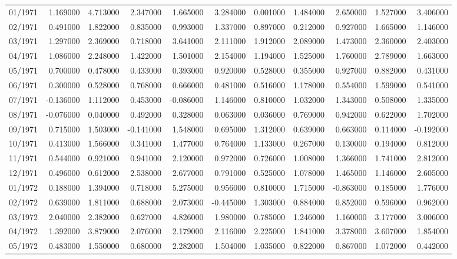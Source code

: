 \begin{tabular}{lrrrrrrrrrr}
01/1971 & 1.169000 & 4.713000 & 2.347000 & 1.665000 & 3.284000 & 0.001000 & 1.484000 & 2.650000 & 1.527000 & 3.406000 \\
02/1971 & 0.491000 & 1.822000 & 0.835000 & 0.993000 & 1.337000 & 0.897000 & 0.212000 & 0.927000 & 1.665000 & 1.146000 \\
03/1971 & 1.297000 & 2.369000 & 0.718000 & 3.641000 & 2.111000 & 1.912000 & 2.089000 & 1.473000 & 2.360000 & 2.403000 \\
04/1971 & 1.086000 & 2.248000 & 1.422000 & 1.501000 & 2.154000 & 1.194000 & 1.525000 & 1.760000 & 2.789000 & 1.663000 \\
05/1971 & 0.700000 & 0.478000 & 0.433000 & 0.393000 & 0.920000 & 0.528000 & 0.355000 & 0.927000 & 0.882000 & 0.431000 \\
06/1971 & 0.300000 & 0.528000 & 0.768000 & 0.666000 & 0.481000 & 0.516000 & 1.178000 & 0.554000 & 1.599000 & 0.541000 \\
07/1971 & -0.136000 & 1.112000 & 0.453000 & -0.086000 & 1.146000 & 0.810000 & 1.032000 & 1.343000 & 0.508000 & 1.335000 \\
08/1971 & -0.076000 & 0.040000 & 0.492000 & 0.328000 & 0.063000 & 0.036000 & 0.769000 & 0.942000 & 0.622000 & 1.702000 \\
09/1971 & 0.715000 & 1.503000 & -0.141000 & 1.548000 & 0.695000 & 1.312000 & 0.639000 & 0.663000 & 0.114000 & -0.192000 \\
10/1971 & 0.413000 & 1.566000 & 0.341000 & 1.477000 & 0.764000 & 1.133000 & 0.267000 & 0.130000 & 0.194000 & 0.812000 \\
11/1971 & 0.544000 & 0.921000 & 0.941000 & 2.120000 & 0.972000 & 0.726000 & 1.008000 & 1.366000 & 1.741000 & 2.812000 \\
12/1971 & 0.496000 & 0.612000 & 2.538000 & 2.677000 & 0.791000 & 0.525000 & 1.078000 & 1.465000 & 1.146000 & 2.605000 \\
01/1972 & 0.188000 & 1.394000 & 0.718000 & 5.275000 & 0.956000 & 0.810000 & 1.715000 & -0.863000 & 0.185000 & 1.776000 \\
02/1972 & 0.639000 & 1.811000 & 0.688000 & 2.073000 & -0.445000 & 1.303000 & 0.884000 & 0.852000 & 0.596000 & 0.962000 \\
03/1972 & 2.040000 & 2.382000 & 0.627000 & 4.826000 & 1.980000 & 0.785000 & 1.246000 & 1.160000 & 3.177000 & 3.006000 \\
04/1972 & 1.392000 & 3.879000 & 2.076000 & 2.179000 & 2.116000 & 2.225000 & 1.841000 & 3.378000 & 3.607000 & 1.854000 \\
05/1972 & 0.483000 & 1.550000 & 0.680000 & 2.282000 & 1.504000 & 1.035000 & 0.822000 & 0.867000 & 1.072000 & 0.442000 \\

\end{tabular}
